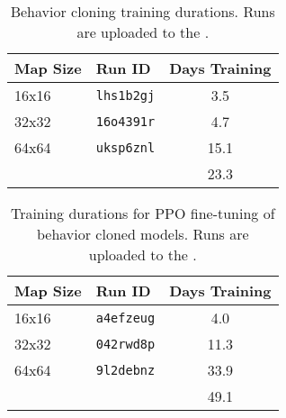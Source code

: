 \documentclass[conference,onecolumn]{IEEEtran}
\newcounter{supptable}
\newenvironment{supptable}
  {\renewcommand{\tablename}{Supplemental Table}\setcounter{table}{\value{supptable}}\addtocounter{supptable}{1}\begin{table}}
  {\end{table}\setcounter{supptable}{\value{table}}}
\begin{document}
\begin{supptable}[H]
    \caption{Behavior cloning training durations. Runs are uploaded to the \microRTSWBProject.}
    \label{tab:bc-training-durations}
    \begin{center}
    \begin{tabular}{llc}
        Map Size & Run ID & Days Training \\
        \midrule
        16x16 & \texttt{lhs1b2gj} & 3.5 \\
        32x32 & \texttt{16o4391r} & 4.7 \\
        64x64 & \texttt{uksp6znl} & 15.1 \\
        \hline
        \multicolumn{1}{l}{} & \multicolumn{1}{l}{} & 23.3
    \end{tabular}
\end{center}
\end{supptable}

\begin{supptable}[H]
    \caption{Training durations for PPO fine-tuning of behavior cloned models. Runs are uploaded to the \microRTSWBProject.}
    \label{tab:bc-ppo-training-durations}
    \begin{center}
    \begin{tabular}{llc}
        Map Size & Run ID & Days Training \\
        \midrule
        16x16 & \texttt{a4efzeug} & 4.0 \\
        32x32 & \texttt{042rwd8p} & 11.3 \\
        64x64 & \texttt{9l2debnz} & 33.9 \\
        \hline
        \multicolumn{1}{l}{} & \multicolumn{1}{l}{} & 49.1
    \end{tabular}
\end{center}
\end{supptable}
\end{document}

